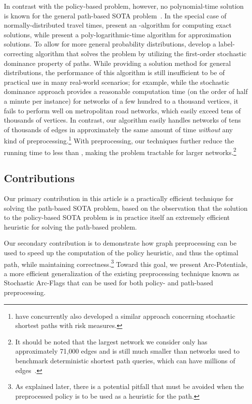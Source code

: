 \documentclass[oribibl]{llncs}
\begin{document}
		In contrast with the policy-based problem, however,
		no polynomial-time solution is known for the general path-based SOTA problem~\cite{nie2009shortest}.
		In the special case of normally-distributed travel times,
		\citet{nikolova2006stochastic} present an -algorithm for computing exact solutions,
		while \citet{lim2013practical} present a poly-logarithmic-time algorithm for approximation solutions.
		To allow for more general probability distributions, \citet*{nie2009shortest} develop a
		label-correcting algorithm that solves the problem by utilizing the first-order stochastic dominance
		property of paths.
		While providing a solution method for general distributions, the performance of this algorithm is
		still insufficient to be of practical use in many real-world scenarios;
		for example, while the stochastic dominance approach provides a reasonable computation time
		(on the order of half a minute per instance) for networks of a few hundred to a thousand vertices,
		it fails to perform well on metropolitan road networks, which easily exceed tens of thousands of vertices.
		In contrast, our algorithm easily handles networks of tens of thousands of edges
		in approximately the same amount of time \textit{without} any kind of preprocessing.\footnote
		{
			\citet{parmentier2014stochastic} have concurrently also developed a similar approach
			concerning stochastic shortest paths with risk measures.
		}
		With preprocessing, our techniques further reduce the running time to less than
		, making the problem tractable for larger networks.\footnote
		{
			It should be noted that the largest network we consider only has approximately 71,000 edges and
			is still much smaller than networks used to benchmark deterministic shortest path queries,
			which can have millions of edges~\cite{delling2009}.
		}

		\subsection{Contributions}
		Our primary contribution in this article is a practically efficient technique for solving the
		path-based SOTA problem, based on the observation that the solution to the policy-based SOTA problem
		is in practice itself an extremely efficient heuristic for solving the path-based problem.

		Our secondary contribution is to demonstrate how graph preprocessing can be used to speed up the
		computation of the policy heuristic, and thus the optimal path, while maintaining correctness.\footnote
		{
			As explained later, there is a potential pitfall that must be avoided when
			the preprocessed policy is to be used as a heuristic for the path.
		}
		Toward this goal, we present Arc-Potentials, a more efficient generalization of the existing
		preprocessing technique known as Stochastic Arc-Flags that can be used for both
		policy- and path-based preprocessing.
\end{document}
